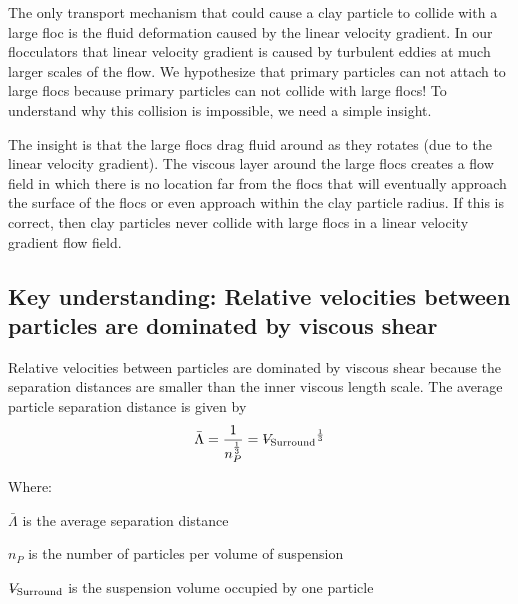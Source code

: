 \documentclass[letterpaper,10pt,english]{sphinxmanual}
\begin{document}
The only transport mechanism that could cause a clay particle to collide with a large floc is the fluid deformation caused by the linear velocity gradient. In our flocculators that linear velocity gradient is caused by turbulent eddies at much larger scales of the flow. We hypothesize that primary particles can not attach to large flocs because primary particles can not collide with large flocs! To understand why this collision is impossible, we need a simple insight.

The insight is that the large flocs drag fluid around as they rotates (due to the linear velocity gradient). The viscous layer around the large flocs creates a flow field in which there is no location far from the flocs that will eventually approach the surface of the flocs or even approach within the clay particle radius. If this is correct, then clay particles never collide with large flocs in a linear velocity gradient flow field.


\subsection{Key understanding: Relative velocities between particles are dominated by viscous shear}
\label{\detokenize{Flocculation/Floc_Model:key-understanding-relative-velocities-between-particles-are-dominated-by-viscous-shear}}
Relative velocities between particles are dominated by viscous shear because the separation distances are smaller than the inner viscous length scale. The average particle separation distance is given by
\begin{equation}\label{equation:Flocculation/Floc_Model:eq_spacing_of_number_concentration}
\begin{split}\bar \Lambda  = \frac{1}{n_P^{\frac{1}{3}}} = {\rlap{\kern.08em--}V_{\rm{Surround}}}^\frac{1}{3}\end{split}
\end{equation}
\begin{DUlineblock}{0em}
\item[] Where:
\item[] \(\bar \Lambda\) is the average separation distance
\item[] \(n_P\) is the number of particles per volume of suspension
\item[] \({\rlap{\kern.08em--}V_{\rm{Surround}}}\) is the suspension volume occupied by one particle
\end{DUlineblock}
\end{document}
